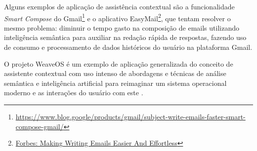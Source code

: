 Alguns exemplos de aplicação de assistência contextual são a funcionalidade \textit{Smart Compose} do Gmail\footnote{\url{https://www.blog.google/products/gmail/subject-write-emails-faster-smart-compose-gmail/}} e o aplicativo EasyMail\footnote{\href{https://www.forbes.com/sites/frederickdaso/2018/02/28/this-mit-and-harvard-startup-is-making-writing-e-mails-easier-and-effortless}{Forbes: Making Writing Emails Easier And Effortless}}, que tentam resolver o mesmo problema: diminuir o tempo gasto na composição de emails utilizando inteligência semântica para auxiliar na redação rápida de respostas, fazendo uso de consumo e processamento de dados históricos do usuário na plataforma Gmail.

O projeto WeaveOS é um exemplo de aplicação generalizada do conceito de assistente contextual com uso intenso de abordagens e técnicas de análise semântica e inteligência artificial para reimaginar um sistema operacional moderno e as interações do usuário com este \cite{bura2016ai}.